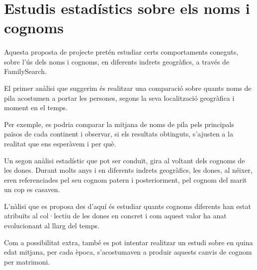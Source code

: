 \section{Estudis estadístics sobre els noms i cognoms}

    \paragraph{}
    Aquesta proposta de projecte pretén estudiar certs comportaments coneguts, sobre l'ús dels noms i cognoms, en diferents indrets geogràfics, a través de FamilySearch.

    El primer anàlisi que suggerim és realitzar una comparació sobre quants noms de pila acostumen a portar les persones, segons la seva localització geogràfica i moment en el temps.

    Per exemple, es podria comparar la mitjana de noms de pila pels principals països de cada continent i observar, si els resultats obtinguts, s'ajusten a la realitat que ens esperàvem i per què.

    Un segon anàlisi estadístic que pot ser conduït, gira al voltant dels cognoms de les dones. Durant molts anys i en diferents indrets geogràfics, les dones, al néixer, eren referenciades pel seu cognom patern i posteriorment, pel cognom del marit un cop es casaven.

    L'nàlisi que es proposa des d'aquí és estudiar quants cognoms diferents han estat atribuïts al col·lectiu de les dones en concret i com aquest valor ha anat evolucionant al llarg del temps.

    Com a possibilitat extra, també es pot intentar realitzar un estudi sobre en quina edat mitjana, per cada època, s'acostumaven a produir aquests canvis de cognom per matrimoni.
